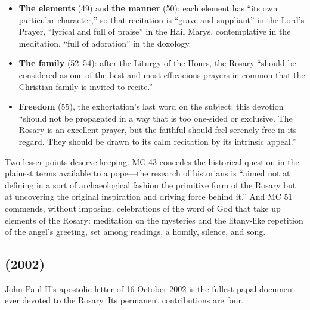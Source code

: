 \begin{itemize}
essentially different planes of reality'' while having the same object.
\item \textbf{The elements} (49) and \textbf{the manner} (50): each
element has ``its own particular character,'' so that recitation is
``grave and suppliant'' in the Lord's Prayer, ``lyrical and full of
praise'' in the Hail Marys, contemplative in the meditation, ``full of
adoration'' in the doxology.
\item \textbf{The family} (52--54): after the Liturgy of the Hours, the
Rosary ``should be considered as one of the best and most efficacious
prayers in common that the Christian family is invited to recite.''
\item \textbf{Freedom} (55), the exhortation's last word on the subject:
this devotion ``should not be propagated in a way that is too one-sided
or exclusive. The Rosary is an excellent prayer, but the faithful should
feel serenely free in its regard. They should be drawn to its calm
recitation by its intrinsic appeal.''
\end{itemize}

\noindent Two lesser points deserve keeping. MC 43 concedes the
historical question in the plainest terms available to a pope---the
research of historians is ``aimed not at defining in a sort of
archaeological fashion the primitive form of the Rosary but at
uncovering the original inspiration and driving force behind it.'' And
MC 51 commends, without imposing, celebrations of the word of God that
take up elements of the Rosary: meditation on the mysteries and the
litany-like repetition of the angel's greeting, set among readings, a
homily, silence, and song.

\subsection{ (2002)}

John Paul II's apostolic letter of 16 October 2002 is the fullest papal
document ever devoted to the Rosary. Its permanent contributions are
four.

